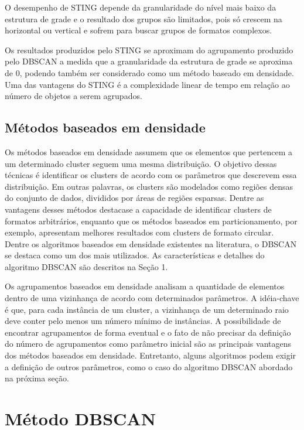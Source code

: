 O desempenho de STING depende da granularidade do nível mais baixo da estrutura de grade e o resultado dos
grupos são limitados, pois só crescem na horizontal ou vertical e sofrem para buscar grupos de formatos complexos.

Os resultados produzidos pelo STING se aproximam do agrupamento produzido pelo
DBSCAN a medida que a granularidade da estrutura de grade se aproxima de 0, podendo
também ser considerado como um método baseado em densidade.
Uma das vantagens do STING é a complexidade linear de tempo em relação ao número de objetos
a serem agrupados.

\subsection{Métodos baseados em densidade}
Os métodos baseados em densidade assumem que os elementos que pertencem a
um determinado cluster seguem uma mesma distribuição. O objetivo dessas técnicas é
identificar os clusters de acordo com os parâmetros que descrevem essa distribuição. Em
outras palavras, os clusters são modelados como regiões densas do conjunto de dados,
divididos por áreas de regiões esparsas. Dentre as vantagens desses métodos destacase
a capacidade de identificar clusters de formatos arbitrários, enquanto que os métodos
baseados em particionamento, por exemplo, apresentam melhores resultados com clusters
de formato circular.
Dentre os algoritmos baseados em densidade existentes na literatura, o DBSCAN se destaca
como um dos mais utilizados. As características e detalhes do algoritmo DBSCAN
são descritos na Seção 1.


Os agrupamentos baseados em densidade analisam a quantidade de elementos dentro de uma vizinhança de acordo com determinados parâmetros. A idéia-chave é que, para cada instância de um cluster, a vizinhança de um determinado raio deve conter pelo menos um número mínimo de instâncias.
A possibilidade de encontrar agrupamentos de forma eventual e o fato de não precisar da definição do número de agrupamentos \cite{yip2005} como parâmetro inicial são as principais vantagens dos métodos baseados em densidade. Entretanto, alguns algoritmos podem exigir a definição de outros parâmetros, como o caso do algoritmo DBSCAN \cite{density-based-clusters} abordado na próxima seção.

\section{Método DBSCAN}
\label{dbscan}

